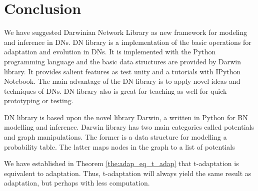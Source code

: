 \chapter{Conclusion}
\label{sec:conclusion}

We have suggested Darwinian Network Library as new framework for modeling and inference in DNs.
DN library is a implementation of the basic operations for adaptation and evolution in DNs.
It is implemented with the Python programming language and the basic data structures are provided by Darwin library.
It provides salient features as test unity and a tutorials with IPython Notebook.
The main advantage of the DN library is to apply novel ideas and techniques of DNs.
DN library also is great for teaching as well for quick prototyping or testing.


DN library is based upon the novel library Darwin, a written in Python for BN modelling and inference.
Darwin library has two main categories called potentials and graph manipulations.
The former is a data structure for modelling a probability table.
The latter maps nodes in the graph to a list of potentials


We have established in Theorem \ref{the:adap_eq_t_adap} that t-adaptation is equivalent to adaptation.
Thus, t-adaptation will always yield the same result as adaptation, but perhaps with less computation.














%
